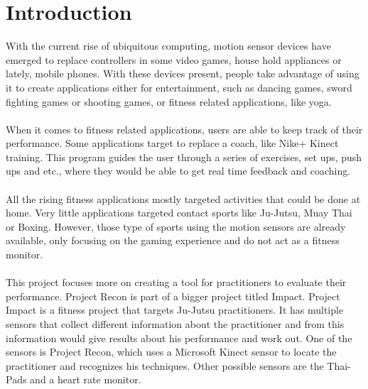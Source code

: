\chapter{Introduction}
\label{chap:intro}
With the current rise of ubiquitous computing, motion sensor devices have emerged to replace controllers in some video games, house hold appliances or lately, mobile phones. With these devices present, people take advantage of using it to create applications either for entertainment, such as dancing games, sword fighting games or shooting games, or fitness related applications, like yoga.  
\\
\\
When it comes to fitness related applications, users are able to keep track of their performance. Some applications target to replace a coach, like Nike+ Kinect training. This program guides the user through a series of exercises, set ups, push ups and etc., where they would be able to get real time feedback and coaching.
\\
\\
All the rising fitness applications mostly targeted activities that could be done at home. Very little applications targeted contact sports like Ju-Jutsu, Muay Thai or Boxing. However, those type of sports using the motion sensors are already available, only focusing on the gaming experience and do not act as a fitness monitor.
\\
\\
This project focuses more on creating a tool for practitioners to evaluate their performance. Project Recon is part of a bigger project titled Impact. Project Impact is a fitness project that targets Ju-Jutsu practitioners. It has multiple sensors that collect different information about the practitioner and from this information would give results about his performance and work out. One of the sensors is Project Recon, which uses a Microsoft Kinect sensor to locate the practitioner and recognizes his techniques. Other possible sensors are the Thai-Pads and a heart rate monitor.


